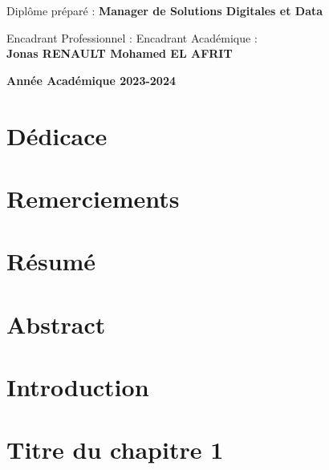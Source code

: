 \documentclass[a4paper, oneside, 12pt, final]{extreport}
\newcommand{\AU} {
\centering \textbf{Année Académique 2023-2024}
}
\begin{document}
\begin{titlepage}
\begin{center}
    \vspace{23pt}
    {Diplôme préparé : \textbf{\large Manager de Solutions Digitales et Data}}\\
    \vspace{46pt}

    Encadrant Professionnel : \hfill Encadrant Académique :\\
    \vspace{10pt}
    \textbf{Jonas RENAULT \hfill Mohamed EL AFRIT}
    \vspace{40pt}

  \end{center}
  \vspace{40pt}
  \AU\\
\end{titlepage}


\chapter*{Dédicace}


\chapter*{Remerciements}


\chapter*{Résumé}



\chapter*{Abstract}


\tableofcontents
{}


\listoffigures
\listoftables
\cleardoublepage

\newpage
\chapter{Introduction}
\label{chap:intorduction}



\chapter{Titre du chapitre 1}
\label{chap:1}

\end{document}
